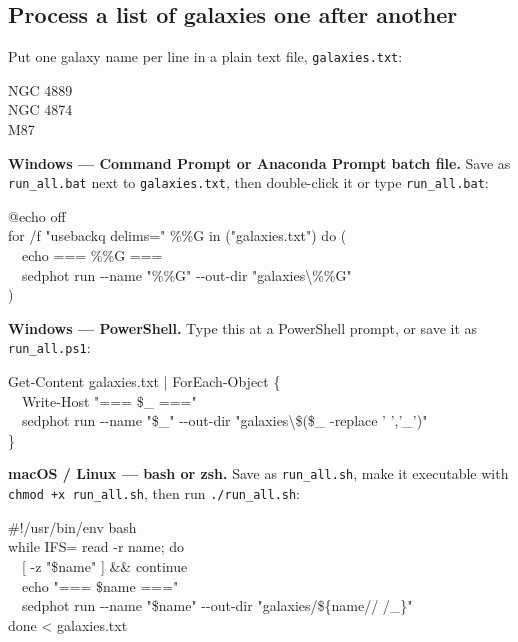 \documentclass[11pt]{article}
\begin{document}
\subsection{Process a list of galaxies one after another}

Put one galaxy name per line in a plain text file,
\texttt{galaxies.txt}:

\begin{cmd}\ttfamily\frenchspacing
NGC 4889\\
NGC 4874\\
M87
\end{cmd}

\begin{sloppypar}
\textbf{Windows --- Command Prompt or Anaconda Prompt batch file.} Save as
\texttt{run\_all.bat} next to \texttt{galaxies.txt}, then double-click it
or type \texttt{run\_all.bat}:
\end{sloppypar}

\begin{cmd}\ttfamily\frenchspacing
@echo off\\
for /f "usebackq delims=" \%\%G in ("galaxies.txt") do (\\
\mbox{}~~echo === \%\%G ===\\
\mbox{}~~sedphot run -{}-name "\%\%G" -{}-out-dir "galaxies\textbackslash\%\%G"\\
)
\end{cmd}

\textbf{Windows --- PowerShell.} Type this at a PowerShell prompt, or save
it as \texttt{run\_all.ps1}:

\begin{cmd}\ttfamily\frenchspacing
Get-Content galaxies.txt | ForEach-Object \{\\
\mbox{}~~Write-Host "=== \$\_ ==="\\
\mbox{}~~sedphot run -{}-name "\$\_" -{}-out-dir "galaxies\textbackslash\$(\$\_ -replace ' ','\_')"\\
\}
\end{cmd}

\textbf{macOS / Linux --- bash or zsh.} Save as \texttt{run\_all.sh}, make
it executable with \texttt{chmod +x run\_all.sh}, then run
\texttt{./run\_all.sh}:

\begin{cmd}\ttfamily\frenchspacing
\#!/usr/bin/env bash\\
while IFS= read -r name; do\\
\mbox{}~~[ -z "\$name" ] \&\& continue\\
\mbox{}~~echo "=== \$name ==="\\
\mbox{}~~sedphot run -{}-name "\$name" -{}-out-dir "galaxies/\$\{name// /\_\}"\\
done < galaxies.txt
\end{cmd}
\end{document}

